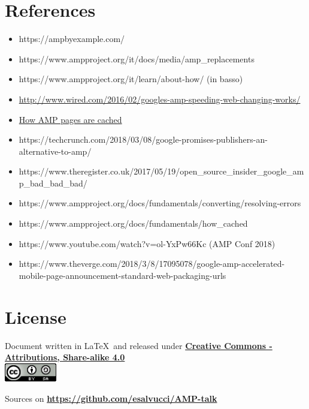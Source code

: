 \documentclass[a4paper]{article}
\begin{document}
\section{References}
\begin{itemize}
    \item https://ampbyexample.com/
    \item https://www.ampproject.org/it/docs/media/amp\_replacements
    \item https://www.ampproject.org/it/learn/about-how/ (in basso)
    \item \href{http://www.wired.com/2016/02/googles-amp-speeding-web-changing-works/}{http://www.wired.com/2016/02/googles-amp-speeding-web-changing-works/}
    \item \href{https://www.ampproject.org/docs/fundamentals/how_cached}{How AMP pages are cached}
    \item https://techcrunch.com/2018/03/08/google-promises-publishers-an-alternative-to-amp/
    \item https://www.theregister.co.uk/2017/05/19/open\_source\_insider\_google\_amp\_bad\_bad\_bad/
    \item https://www.ampproject.org/docs/fundamentals/converting/resolving-errors
    \item https://www.ampproject.org/docs/fundamentals/how\_cached
    \item https://www.youtube.com/watch?v=ol-YxPw66Kc (AMP Conf 2018)
    \item https://www.theverge.com/2018/3/8/17095078/google-amp-accelerated-mobile-page-announcement-standard-web-packaging-urls
\end{itemize}

\section{License}

Document written in \LaTeX\ and released under \textbf{\href{http://creativecommons.org/licenses/by-sa/4.0/}{Creative Commons - Attributions, Share-alike 4.0}}\\

\includegraphics[height=0.8cm]{images/cc.png}

Sources on \textbf{\url{https://github.com/esalvucci/AMP-talk}}
\end{document}
